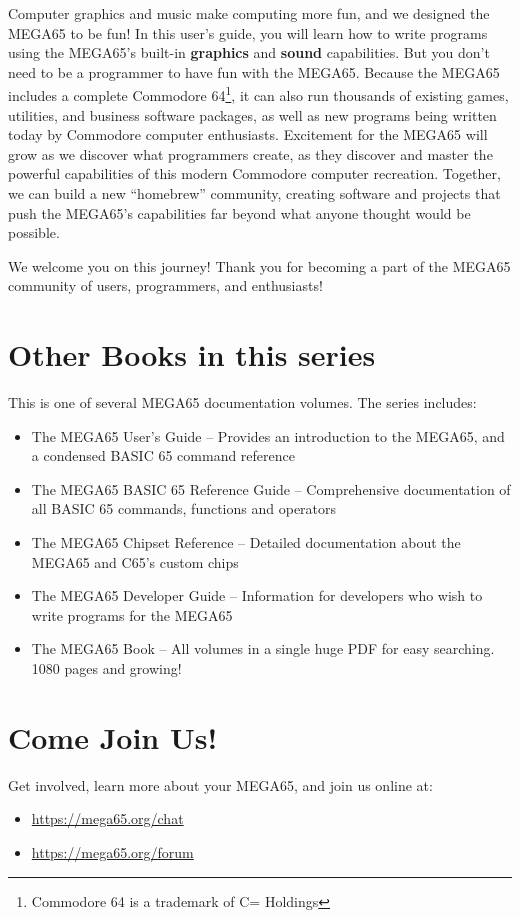 Computer graphics and music make computing more fun, and we designed the MEGA65 to be fun! In this user's guide, you will learn how to write programs using the MEGA65's built-in {\bf graphics} and {\bf sound} capabilities. But you don't need to be a programmer to have fun with the MEGA65. Because the MEGA65 includes a complete Commodore{\textregistered} 64{\texttrademark}\footnote{Commodore 64 is a trademark of C= Holdings}, it can also run thousands of existing games, utilities, and business software packages, as well as new programs being written today by Commodore computer enthusiasts. Excitement for the MEGA65 will grow as we discover what programmers create, as they discover and master the powerful capabilities of this modern Commodore computer recreation. Together, we can build a new ``homebrew'' community, creating software and projects that push the MEGA65's capabilities far beyond what anyone thought would be possible.

We welcome you on this journey! Thank you for becoming a part of the MEGA65
community of users, programmers, and enthusiasts!

\section{Other Books in this series}

This is one of several MEGA65 documentation volumes. The series includes:

\begin{itemize}
    \item The MEGA65 User's Guide -- Provides an introduction to the MEGA65, and a condensed BASIC 65 command reference
    \item The MEGA65 BASIC 65 Reference Guide -- Comprehensive documentation of all BASIC 65 commands, functions and operators
    \item The MEGA65 Chipset Reference -- Detailed documentation about the MEGA65 and C65's custom chips
    \item The MEGA65 Developer Guide -- Information for developers who wish to write programs for the MEGA65
    \item The MEGA65 Book -- All volumes in a single huge PDF for easy searching. 1080 pages and growing!
\end{itemize}

\section{Come Join Us!}
Get involved, learn more about your MEGA65, and join us online at:

\begin{itemize}
    \item \url{https://mega65.org/chat}
    \item \url{https://mega65.org/forum}
\end{itemize}
